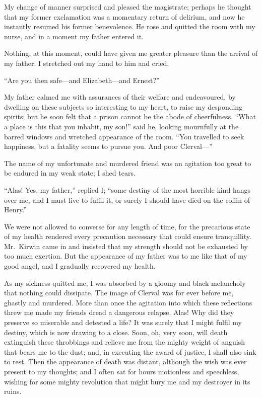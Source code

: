 \documentclass[12pt,openright]{book}
\begin{document}
My change of manner surprised and pleased the magistrate; perhaps he thought that my former exclamation was a momentary return of delirium, and now he instantly resumed his former benevolence. He rose and quitted the room with my nurse, and in a moment my father entered it.

Nothing, at this moment, could have given me greater pleasure than the arrival of my father. I stretched out my hand to him and cried,

“Are you then safe—and Elizabeth—and Ernest?”

My father calmed me with assurances of their welfare and endeavoured, by dwelling on these subjects so interesting to my heart, to raise my desponding spirits; but he soon felt that a prison cannot be the abode of cheerfulness. “What a place is this that you inhabit, my son!” said he, looking mournfully at the barred windows and wretched appearance of the room. “You travelled to seek happiness, but a fatality seems to pursue you. And poor Clerval—”

The name of my unfortunate and murdered friend was an agitation too great to be endured in my weak state; I shed tears.

“Alas! Yes, my father,” replied I; “some destiny of the most horrible kind hangs over me, and I must live to fulfil it, or surely I should have died on the coffin of Henry.”

We were not allowed to converse for any length of time, for the precarious state of my health rendered every precaution necessary that could ensure tranquillity. Mr. Kirwin came in and insisted that my strength should not be exhausted by too much exertion. But the appearance of my father was to me like that of my good angel, and I gradually recovered my health.

As my sickness quitted me, I was absorbed by a gloomy and black melancholy that nothing could dissipate. The image of Clerval was for ever before me, ghastly and murdered. More than once the agitation into which these reflections threw me made my friends dread a dangerous relapse. Alas! Why did they preserve so miserable and detested a life? It was surely that I might fulfil my destiny, which is now drawing to a close. Soon, oh, very soon, will death extinguish these throbbings and relieve me from the mighty weight of anguish that bears me to the dust; and, in executing the award of justice, I shall also sink to rest. Then the appearance of death was distant, although the wish was ever present to my thoughts; and I often sat for hours motionless and speechless, wishing for some mighty revolution that might bury me and my destroyer in its ruins.
\end{document}
